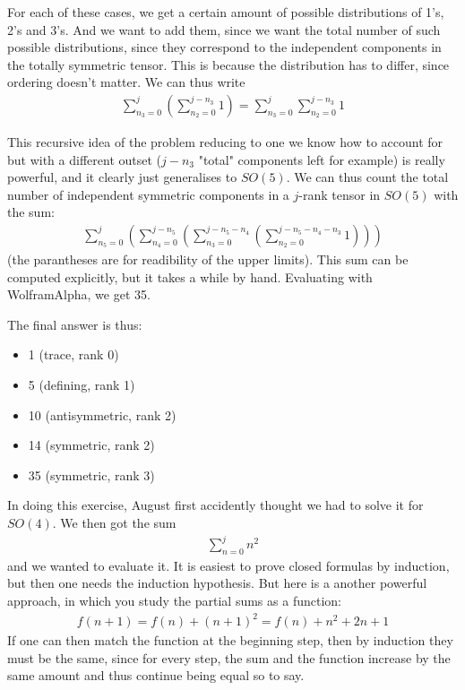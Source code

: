 \documentclass[a4paper]{article}
\theoremstyle{definition} %
\theoremstyle{plain} %
\theoremstyle{remark} %
\begin{document}
    For each of these cases, we get a certain amount of possible distributions of 1's, 2's and 3's. And we want to add them, since we want the total number of such possible distributions, since they correspond to the independent components in the totally symmetric tensor. This is because the distribution has to differ, since ordering doesn't matter. We can thus write \begin{align*}
        \sum_{n_3 = 0}^j \left( \sum_{n_2 = 0} ^{j - n_3} 1 \right) = \sum_{n_3 = 0}^j\sum_{n_2 = 0} ^{j - n_3} 1
    \end{align*}

    This recursive idea of the problem reducing to one we know how to account for but with a different outset (\(j - n_3\) "total" components left for example) is really powerful, and it clearly just generalises to \(SO(5)\). We can thus count the total number of independent symmetric components in a \(j\)-rank tensor in \(SO(5)\) with the sum:
    \begin{align*}
        \sum_{n_5 = 0}^{j} \left(\sum_{n_4 = 0}^{j - n_5} \left(\sum_{n_3 = 0}^{j - n_5 - n_4} \left(\sum_{n_2 = 0}^{j - n_5 - n_4 - n_3} 1 \right)\right)\right)
    \end{align*} 
    (the parantheses are for readibility of the upper limits). This sum can be computed explicitly, but it takes a while by hand. Evaluating with WolframAlpha, we get 35. 

    The final answer is thus: \begin{itemize}
        \item 1 (trace, rank 0)
        \item 5 (defining, rank 1)
        \item 10 (antisymmetric, rank 2)
        \item 14 (symmetric, rank 2)
        \item 35 (symmetric, rank 3)
    \end{itemize}

    In doing this exercise, August first accidently thought we had to solve it for \(SO(4)\). We then got the sum \begin{align*}
        \sum_{n = 0}^j n^{2}  
    \end{align*} 
    and we wanted to evaluate it. It is easiest to prove closed formulas by induction, but then one needs the induction hypothesis. But here is a another powerful approach, in which you study the partial sums as a function: \begin{align*}
        f(n + 1) = f(n) + (n + 1)^{2} = f(n) + n^{2} + 2n + 1
    \end{align*} 
    If one can then match the function at the beginning step, then by induction they must be the same, since for every step, the sum and the function increase by the same amount and thus continue being equal so to say.
\end{document}
